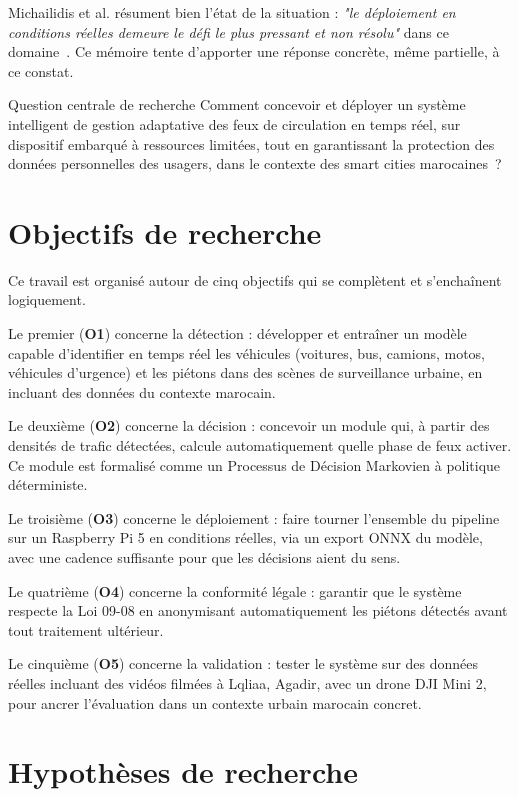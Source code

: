 Michailidis et al. résument bien l'état
de la situation : \textit{"le déploiement
en conditions réelles demeure le défi le
plus pressant et non résolu"} dans ce
domaine~\cite{michailidis2025}. Ce mémoire
tente d'apporter une réponse concrète,
même partielle, à ce constat.

\begin{definitionbox}{Question centrale de recherche}
Comment concevoir et déployer un système
intelligent de gestion adaptative des feux
de circulation en temps réel, sur dispositif
embarqué à ressources limitées, tout en
garantissant la protection des données
personnelles des usagers, dans le contexte
des smart cities marocaines~?
\end{definitionbox}

\section{Objectifs de recherche}

Ce travail est organisé autour de cinq
objectifs qui se complètent et s'enchaînent
logiquement.

Le premier (\textbf{O1}) concerne la détection :
développer et entraîner un modèle capable
d'identifier en temps réel les véhicules
(voitures, bus, camions, motos, véhicules
d'urgence) et les piétons dans des scènes
de surveillance urbaine, en incluant des
données du contexte marocain.

Le deuxième (\textbf{O2}) concerne la décision :
concevoir un module qui, à partir des
densités de trafic détectées, calcule
automatiquement quelle phase de feux
activer. Ce module est formalisé comme
un Processus de Décision Markovien à
politique déterministe.

Le troisième (\textbf{O3}) concerne le déploiement :
faire tourner l'ensemble du pipeline sur
un Raspberry Pi 5 en conditions réelles,
via un export ONNX du modèle, avec une
cadence suffisante pour que les décisions
aient du sens.

Le quatrième (\textbf{O4}) concerne la conformité
légale : garantir que le système respecte
la Loi 09-08 en anonymisant automatiquement
les piétons détectés avant tout traitement
ultérieur.

Le cinquième (\textbf{O5}) concerne la validation :
tester le système sur des données réelles
incluant des vidéos filmées à Lqliaa,
Agadir, avec un drone DJI Mini 2, pour
ancrer l'évaluation dans un contexte
urbain marocain concret.

\section{Hypothèses de recherche}

